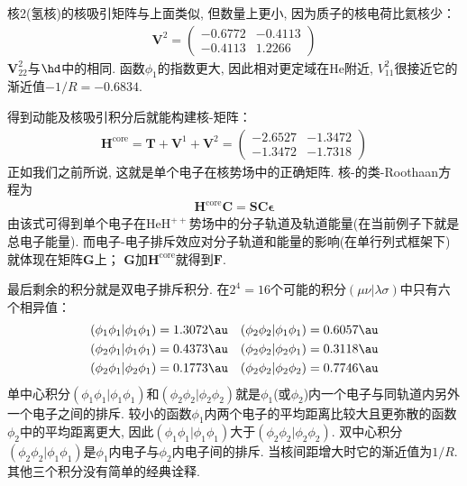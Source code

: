 核2(氢核)的核吸引矩阵与上面类似, 
但数量上更小, 
因为质子的核电荷比氦核少：
\begin{align}
	\mathbf{V}^2 = 
	\begin{pmatrix}
		-0.6772&-0.4113\\-0.4113&1.2266
	\end{pmatrix}
\end{align}
$\mathbf{V}_{22}^2$与$\hd$中的相同. 函数$\phi_1$的指数更大, 因此相对更定域在$\mathrm{He}$附近, $V_{11}^2$很接近它的渐近值$-1/R=-0.6834$.

得到动能及核吸引积分后就能构建核-\ha 矩阵：
\begin{align}
	\mathbf{H}^\mathrm{core} = \mathbf{T+V}^1 + \mathbf{V}^2=
	\begin{pmatrix}
		-2.6527&-1.3472\\-1.3472&-1.7318
	\end{pmatrix}
\end{align}
正如我们之前所说, 
这就是单个电子在核势场中的正确\ha 矩阵. 
核-\ha 的类-Roothaan方程为
\begin{align}
	\mathbf{H}^\mathrm{core}\mathbf{C=SC}\bm{\epsilon}
\end{align}
由该式可得到单个电子在$\mathrm{HeH}^{++}$势场中的分子轨道及轨道能量(在当前例子下就是总电子能量). 
而电子-电子排斥效应对分子轨道和能量的影响(在单行列式框架下)就体现在矩阵$\mathbf{G}$上；
$\mathbf{G}$加$\mathbf{H}^\mathrm{core}$就得到$\mathbf{F}$.


最后剩余的积分就是双电子排斥积分. 
在$2^4=16$个可能的积分$(\mu\nu|\lambda\sigma)$中只有六个相异值：
\begin{align*}
	(\phi_1\phi_1|\phi_1\phi_1)&=1.3072\au& (\phi_2\phi_2|\phi_1\phi_1)&=0.6057\au\\
	(\phi_2\phi_1|\phi_1\phi_1)&=0.4373\au& (\phi_2\phi_2|\phi_2\phi_1)&=0.3118\au\\
	(\phi_2\phi_1|\phi_2\phi_1)&=0.1773\au& (\phi_2\phi_2|\phi_2\phi_2)&=0.7746\au\\
\end{align*}
单中心积分$(\phi_1\phi_1|\phi_1\phi_1)$和$(\phi_2\phi_2|\phi_2\phi_2)$就是$\phi_1$(或$\phi_2$)内一个电子与同轨道内另外一个电子之间的排斥. 
较小的函数$\phi_1$内两个电子的平均距离比较大且更弥散的函数$\phi_2$中的平均距离更大, 
因此$(\phi_1\phi_1|\phi_1\phi_1)$大于$(\phi_2\phi_2|\phi_2\phi_2)$. 
双中心积分$(\phi_2\phi_2|\phi_1\phi_1)$是$\phi_1$内电子与$\phi_2$内电子间的排斥. 
当核间距增大时它的渐近值为$1/R$. 
其他三个积分没有简单的经典诠释.


